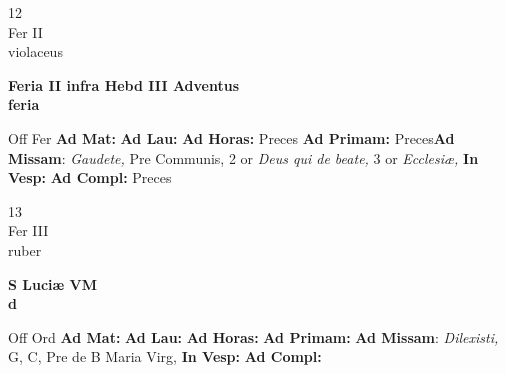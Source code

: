 \documentclass[10pt, openany]{book}
\begin{document}
        \begin{center}
            \begin{minipage}{3.5in}
                \vspace{2em}
                \begin{minipage}{0.5in}
                    {\Huge 12} \\
                    {\normalsize Fer II} \\
                    {\normalsize violaceus}
                \end{minipage}
                \begin{minipage}{3.0in}
                    \textbf{ \large Feria II infra Hebd III Adventus \\
                    \textnormal{\normalsize feria}} \\ 
                \end{minipage}
                \begin{justify}Off Fer
                    \textbf{Ad Mat: }
                    \textbf{Ad Lau: }
                    \textbf{Ad Horas: }Preces
                    \textbf{Ad Primam: }Preces\textbf{Ad Missam}: \textit{Gaudete,} Pre Communis, 2 or \textit{Deus qui de beate,} 3 or \textit{Ecclesiæ,}  
                    \textbf{In Vesp: }
                    \textbf{Ad Compl: }Preces
                \end{justify}
            \end{minipage}
        \end{center}
    
        \begin{center}
            \begin{minipage}{3.5in}
                \vspace{2em}
                \begin{minipage}{0.5in}
                    {\Huge 13} \\
                    {\normalsize Fer III} \\
                    {\normalsize ruber}
                \end{minipage}
                \begin{minipage}{3.0in}
                    \textbf{ \large S Luciæ VM \\
                    \textnormal{\normalsize d}} \\ 
                \end{minipage}
                \begin{justify}Off Ord
                    \textbf{Ad Mat: }
                    \textbf{Ad Lau: }
                    \textbf{Ad Horas: }
                    \textbf{Ad Primam: }\textbf{Ad Missam}: \textit{Dilexisti,} G, C, Pre de B Maria Virg,  
                    \textbf{In Vesp: }
                    \textbf{Ad Compl: }
                \end{justify}
            \end{minipage}
        \end{center}
    
\end{document}
